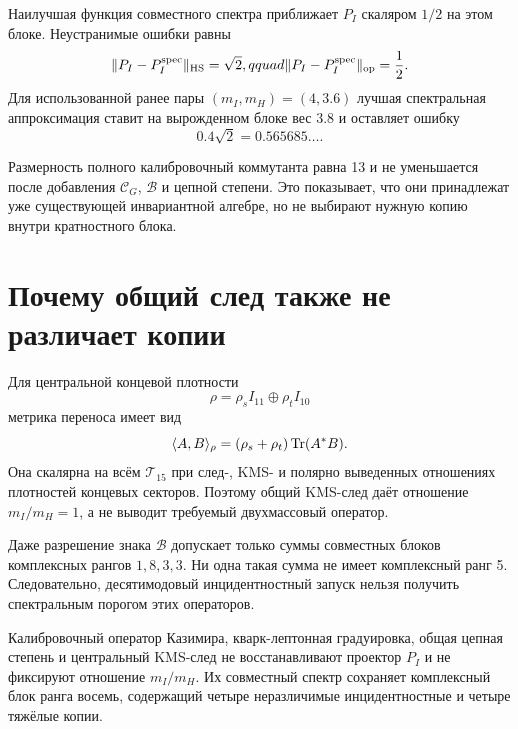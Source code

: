 Наилучшая функция совместного спектра приближает $P_I$ скаляром $1/2$ на
этом блоке. Неустранимые ошибки равны
\begin{equation}
 \|P_I-P_I^{\rm spec}\|_{\rm HS}=\sqrt2,qquad
 \|P_I-P_I^{\rm spec}\|_{\rm op}=\frac12.
 \label{eq:v8-incidence-projector-spectral-residual}
\end{equation}
Для использованной ранее пары $(m_I,m_H)=(4,3.6)$ лучшая спектральная
аппроксимация ставит на вырожденном блоке вес $3.8$ и оставляет ошибку
\begin{equation}
 0.4\sqrt2=0.565685\ldots.
 \label{eq:v8-two-mass-spectral-residual}
\end{equation}

Размерность полного калибровочный коммутанта равна 13 и не уменьшается после
добавления $\mathcal C_G$, $\mathcal B$ и цепной степени. Это показывает,
что они принадлежат уже существующей инвариантной алгебре, но не выбирают
нужную копию внутри кратностного блока.

\section{Почему общий след также не различает копии}

Для центральной концевой плотности
\begin{equation}
 \rho=\rho_sI_{11}\oplus\rho_tI_{10}
 \end{equation}
метрика переноса имеет вид
\begin{equation}
 \langle A,B\rangle_\rho
 = (\rho_s+\rho_t)\operatorname{Tr}(A^*B).
 \label{eq:v8-common-kms-transfer-metric}
\end{equation}
Она скалярна на всём $\mathcal T_{15}$ при след-, KMS- и полярно выведенных
отношениях плотностей концевых секторов. Поэтому общий KMS-след даёт отношение
$m_I/m_H=1$, а не выводит требуемый двухмассовый оператор.

Даже разрешение знака $\mathcal B$ допускает только суммы совместных блоков
комплексных рангов $1,8,3,3$. Ни одна такая сумма не имеет комплексный ранг
5. Следовательно, десятимодовый инцидентностный запуск нельзя получить
спектральным порогом этих операторов.

\begin{theorem}
Калибровочный оператор Казимира, кварк-лептонная градуировка, общая цепная степень и
центральный KMS-след не восстанавливают проектор $P_I$ и не фиксируют
отношение $m_I/m_H$. Их совместный спектр сохраняет комплексный блок ранга
восемь, содержащий четыре неразличимые инцидентностные и четыре тяжёлые копии.
\end{theorem}

